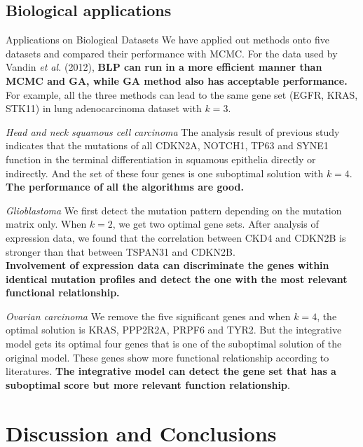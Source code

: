 \documentclass[xcolor=dvipsnames]{beamer}
\begin{document}
\subsection{Biological applications}
\begin{frame}{Applications on Biological Datasets}
We have applied out methods onto five datasets and compared their performance with MCMC. For the data used by Vandin {\em et al.} (2012), \textbf{BLP can run in a more efficient manner than MCMC and GA, while GA method also has acceptable performance.} For example, all the three methods can lead to the same gene set (EGFR, KRAS, STK11) in lung adenocarcinoma dataset with $k=3$.\\
\end{frame}
\begin{frame}{\em Head and neck squamous cell carcinoma}
The analysis result of previous study indicates that the mutations of all CDKN2A, NOTCH1, TP63 and SYNE1 function in the terminal differentiation in squamous epithelia directly or indirectly. And the set of these four genes is one suboptimal solution with $k=4$.\\
\textbf{The performance of all the algorithms are good.}
\end{frame}
\begin{frame}{\em Glioblastoma}
We first detect the mutation pattern depending on the mutation matrix only. When $k=2$, we get two optimal gene sets. After analysis of expression data, we found that the correlation between CKD4 and CDKN2B is stronger than that between TSPAN31 and CDKN2B.\\
\textbf{Involvement of expression data can discriminate the genes within identical mutation profiles and detect the one with the most relevant functional relationship.}
\end{frame}
\begin{frame}{\em Ovarian carcinoma}
We remove the five significant genes and when $k=4$, the optimal solution is KRAS, PPP2R2A, PRPF6 and TYR2. But the integrative model gets its optimal four genes that is one of the suboptimal solution of the original model. These genes show more functional relationship according to literatures. \textbf{The integrative model can detect the gene set that has a suboptimal score but more relevant function relationship}.
\end{frame}
\section{Discussion and Conclusions}
\end{document}
